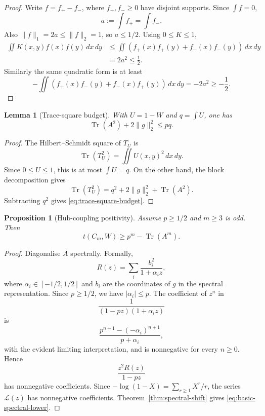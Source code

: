 \documentclass[11pt]{article}
\newtheorem{proposition}[theorem]{Proposition}
\newtheorem{lemma}[theorem]{Lemma}
\newcommand{\Tr}{\operatorname{Tr}}
\newcommand{\norm}[1]{\lVert #1\rVert}
\begin{document}
\begin{proof}
Write $f=f_+-f_-$, where $f_+,f_-\ge0$ have disjoint supports.  Since $\int f=0$,
\[
        a:=\int f_+=\int f_-.
\]
Also $\norm f_1=2a\le\norm f_2=1$, so $a\le1/2$.  Using $0\le K\le1$,
\[
\begin{aligned}
        \iint K(x,y)f(x)f(y)\,dx\,dy
        &\le \iint (f_+(x)f_+(y)+f_-(x)f_-(y))\,dx\,dy \\
        &=2a^2\le\frac12.
\end{aligned}
\]
Similarly the same quadratic form is at least
\[
        -\iint(f_+(x)f_-(y)+f_-(x)f_+(y))\,dx\,dy=-2a^2\ge-\frac12.
\]
\end{proof}

\begin{lemma}[Trace-square budget]\label{lem:trace-square-budget}
With $U=1-W$ and $q=\int U$, one has
\begin{equation}\label{eq:trace-square-budget}
        \Tr(A^2)+2\norm g_2^2\le pq.
\end{equation}
\end{lemma}

\begin{proof}
The Hilbert--Schmidt square of $T_U$ is
\[
        \Tr(T_U^2)=\iint U(x,y)^2\,dx\,dy.
\]
Since $0\le U\le1$, this is at most $\int U=q$.  On the other hand, the block decomposition gives
\[
        \Tr(T_U^2)=q^2+2\norm g_2^2+\Tr(A^2).
\]
Subtracting $q^2$ gives \eqref{eq:trace-square-budget}.
\end{proof}

\begin{proposition}[Hub-coupling positivity]\label{prop:hub-positivity}
Assume $p\ge1/2$ and $m\ge3$ is odd.  Then
\begin{equation}\label{eq:basic-spectral-lower}
        t(C_m,W)\ge p^m-\Tr(A^m).
\end{equation}
\end{proposition}

\begin{proof}
Diagonalise $A$ spectrally.  Formally,
\[
        R(z)=\sum_i \frac{b_i^2}{1+\alpha_i z},
\]
where $\alpha_i\in[-1/2,1/2]$ and $b_i$ are the coordinates of $g$ in the spectral representation.  Since $p\ge1/2$, we have $|\alpha_i|\le p$.  The coefficient of $z^n$ in
\[
        \frac{1}{(1-pz)(1+\alpha_i z)}
\]
is
\[
        \frac{p^{n+1}-(-\alpha_i)^{n+1}}{p+\alpha_i},
\]
with the evident limiting interpretation, and is nonnegative for every $n\ge0$.  Hence
\[
        \frac{z^2R(z)}{1-pz}
\]
has nonnegative coefficients.  Since $-\log(1-X)=\sum_{r\ge1}X^r/r$, the series $\mathcal L(z)$ has nonnegative coefficients.  Theorem~\ref{thm:spectral-shift} gives \eqref{eq:basic-spectral-lower}.
\end{proof}
\end{document}
